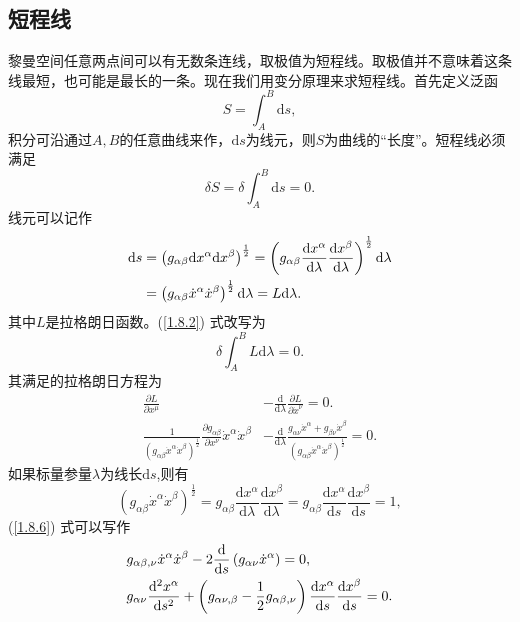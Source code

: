 \documentclass[11pt, a4paper, oneside, onecolumn]{ctexart}
\numberwithin{equation}{subsection}
\begin{document}
\subsection{短程线}
黎曼空间任意两点间可以有无数条连线，取极值为短程线。取极值并不意味着这条线最短，也可能是最长的一条。现在我们用变分原理来求短程线。首先定义泛函
\begin{equation}
S=\int_{A}^{B}\mathrm{d}s,
\end{equation}
积分可沿通过$A,B$的任意曲线来作，$\mathrm{d}s$为线元，则$S$为曲线的“长度”。短程线必须满足
\begin{equation}
\delta{}S=\delta{}\int_{A}^{B}\mathrm{d}s=0.\label{1.8.2}
\end{equation}
线元可以记作
\begin{align}
\mathrm{d}s&=\left(g_{\alpha\beta}\mathrm{d}x^{\alpha}\mathrm{d}x^{\beta}\right)^{\frac12}=\left(g_{\alpha\beta}\frac{\mathrm{d}x^{\alpha}}{\mathrm{d}\lambda}\frac{\mathrm{d}x^{\beta}}{\mathrm{d}\lambda}\right)^{\frac12}\mathrm{d}\lambda\notag\\
&=\left(g_{\alpha\beta}\dot{x}^{\alpha}\dot{x}^{\beta}\right)^{\frac12}\mathrm{d}\lambda=L\mathrm{d}\lambda.
\end{align}
其中$L$是拉格朗日函数。(\ref{1.8.2}) 式改写为
\begin{equation}
\delta{}\int_{A}^{B}L\mathrm{d}\lambda=0.
\end{equation}
其满足的拉格朗日方程为
\begin{align}
\frac{\partial{}L}{\partial{}x^{\mu}}&-\frac{\mathrm{d}}{\mathrm{d}\lambda}\frac{\partial{}L}{\partial{}\dot{x}^{\nu}}=0.\\
\frac{1}{\left(g_{\alpha\beta}\dot{x}^{\alpha}\dot{x}^{\beta}\right)^{\frac12}}\frac{\partial{}g_{\alpha\beta}}{\partial{}x^{\nu}}\dot{x}^{\alpha}\dot{x}^{\beta}&-\frac{\mathrm{d}}{\mathrm{d}\lambda}\frac{g_{\alpha\nu}\dot{x}^{\alpha}+g_{\beta\nu}\dot{x}^{\beta}}{\left(g_{\alpha\beta}\dot{x}^{\alpha}\dot{x}^{\beta}\right)^{\frac12}}=0.\label{1.8.6}
\end{align}
如果标量参量$\lambda$为线长$\mathrm{d}s$,则有
\begin{equation}
\left(g_{\alpha\beta}\dot{x}^{\alpha}\dot{x}^{\beta}\right)^{\frac12}=g_{\alpha\beta}\frac{\mathrm{d}x^{\alpha}}{\mathrm{d}\lambda}\frac{\mathrm{d}x^{\beta}}{\mathrm{d}\lambda}=g_{\alpha\beta}\frac{\mathrm{d}x^{\alpha}}{\mathrm{d}s}\frac{\mathrm{d}x^{\beta}}{\mathrm{d}s}=1,
\end{equation}
(\ref{1.8.6}) 式可以写作
\begin{align}
&g_{\alpha\beta,\nu}\dot{x}^{\alpha}\dot{x}^{\beta}-2\frac{\mathrm{d}}{\mathrm{d}s}\left(g_{\alpha\nu}\dot{x}^{\alpha}\right)=0,\notag\\
&g_{\alpha\nu}\frac{\mathrm{d}^{2}x^{\alpha}}{\mathrm{d}s^{2}}+\left(g_{\alpha\nu,\beta}-\frac12g_{\alpha\beta,\nu}\right)\frac{\mathrm{d}x^{\alpha}}{\mathrm{d}s}\frac{\mathrm{d}x^{\beta}}{\mathrm{d}s}=0.\label{1.8.8}
\end{align}
\end{document}
